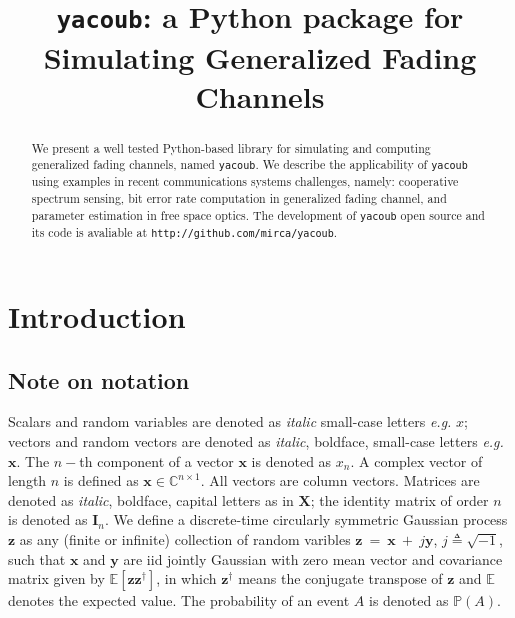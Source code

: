 \documentclass[conference, 10pt]{IEEEtran}
\begin{document}
\title{\texttt{yacoub}: a Python package for Simulating Generalized Fading Channels}

\author{
}

\maketitle

\begin{abstract}
    We present a well tested Python-based library for simulating and computing
    generalized fading channels, named \texttt{yacoub}. We describe the
    applicability of \texttt{yacoub} using examples in recent communications
    systems challenges, namely: cooperative spectrum sensing, bit error rate computation
    in generalized fading channel, and parameter estimation in free space optics.
    The development of \texttt{yacoub} open source and its code is avaliable at
    \texttt{http://github.com/mirca/yacoub}.
\end{abstract}

\IEEEpeerreviewmaketitle
\section{Introduction}

\subsection{Note on notation}
Scalars and random variables are denoted as \textit{italic} small-case letters \textit{e.g.} $x$;
vectors and random vectors are denoted as \textit{italic}, boldface, small-case letters \textit{e.g.} $\bm{x}$.
The $n-$th component of a vector $\bm{x}$ is denoted as $x_n$.
A complex vector of length $n$ is defined as $\bm{x} \in \mathbb{C}^{n\times 1}$. All
vectors are column vectors. Matrices are denoted as \textit{italic}, boldface, capital
letters as in $\bm{X}$; the identity matrix of order $n$ is denoted as $\bm{I}_n$.
We define a discrete-time circularly symmetric Gaussian process $\bm{z}$ as any (finite or infinite) collection
of random varibles $\bm{z}~=~\bm{x}~+~j\bm{y}$, $j \triangleq \sqrt{-1}$, such that
$\bm{x}$ and $\bm{y}$ are iid jointly Gaussian with zero mean vector and covariance
matrix given by $\mathbb{E}\left[\bm{z}\bm{z}^{\dagger}\right]$, in which $\bm{z}^\dagger$
means the conjugate transpose of $\bm{z}$ and $\mathbb{E}$ denotes the expected value. The
probability of an event $A$ is denoted as $\mathbb{P}(A)$.
\end{document}
